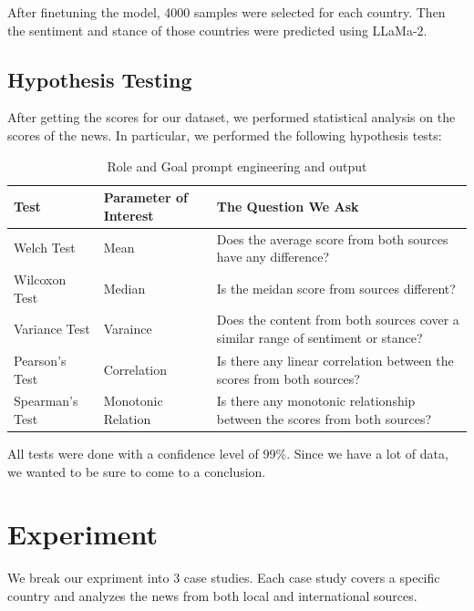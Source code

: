 \documentclass{article}
\theoremstyle{mytheoremstyle}
\theoremstyle{mytheoremstyle}
\theoremstyle{myproblemstyle}
\begin{document}
    After finetuning the model, 4000 samples were selected for each country. Then the sentiment and stance of those countries were predicted using LLaMa-2.

    \subsection{Hypothesis Testing}
    After getting the scores for our dataset, we performed statistical analysis on the scores of the news. In particular, we performed the following hypothesis tests:

    \begin{table}[hp]
        \centering
        \begin{tabular}{ | m{2cm} | m{3cm}| m{8cm} | } 
          \hline
          \textbf{Test} & \textbf{Parameter of Interest} & \textbf{The Question We Ask} \\ 
          \hline
            Welch Test & Mean & Does the average score from both sources have any difference? \\
            \hline
            Wilcoxon Test & Median & Is the meidan score from sources different? \\
            \hline
            Variance Test & Varaince & Does the content from both sources cover a similar range of sentiment or stance? \\
            \hline
            Pearson's Test & Correlation & Is there any linear correlation between the scores from both sources? \\
            \hline
            Spearman's Test & Monotonic Relation & Is there any monotonic relationship between the scores from both sources? \\
            \hline
        \end{tabular}

        \caption[Prompt Engineering]{Role and Goal prompt engineering and output}
        \label{table:prompt_engineering}
    \end{table}

    All tests were done with a confidence level of 99\%. Since we have a lot of data, we wanted to be sure to come to a conclusion. 

    \section{Experiment}
    
    We break our expriment into 3 case studies. Each case study covers a specific country and analyzes the news from both local and international sources.
\end{document}
